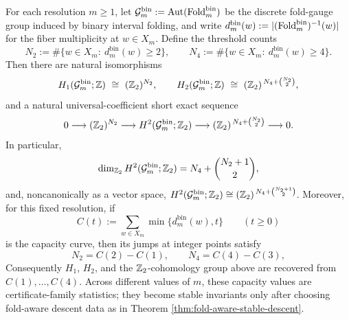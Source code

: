 \begin{theorem}\label{thm:window6-foldbin-gauge-low-degree-homology}
For each resolution \(m\ge 1\), let
\(
\mathcal{G}^{\mathrm{bin}}_m:=\operatorname{Aut}(\operatorname{Fold}^{\mathrm{bin}}_m)
\)
be the discrete fold-gauge group induced by binary interval folding, and write
\(
d^{\mathrm{bin}}_m(w):=\lvert (\operatorname{Fold}^{\mathrm{bin}}_m)^{-1}(w)\rvert
\)
for the fiber multiplicity at \(w\in X_m\).
Define the threshold counts
\[
N_2:=\#\{w\in X_m:\ d^{\mathrm{bin}}_m(w)\ge 2\},
\qquad
N_4:=\#\{w\in X_m:\ d^{\mathrm{bin}}_m(w)\ge 4\}.
\]
Then there are natural isomorphisms
\[
H_1(\mathcal{G}^{\mathrm{bin}}_m;\ZZ)\ \cong\ (\ZZ_2)^{N_2},
\qquad
H_2(\mathcal{G}^{\mathrm{bin}}_m;\ZZ)\ \cong\ (\ZZ_2)^{\,N_4+\binom{N_2}{2}},
\]
and a natural universal-coefficient short exact sequence
\[
0\longrightarrow (\mathbb{Z}_2)^{N_2}
\longrightarrow H^2(\mathcal{G}^{\mathrm{bin}}_m;\mathbb{Z}_2)
\longrightarrow (\mathbb{Z}_2)^{\,N_4+\binom{N_2}{2}}
\longrightarrow 0.
\]
In particular,
\[
\dim_{\mathbb{Z}_2}H^2(\mathcal{G}^{\mathrm{bin}}_m;\mathbb{Z}_2)
=N_4+\binom{N_2+1}{2},
\]
and, noncanonically as a vector space, \(H^2(\mathcal{G}^{\mathrm{bin}}_m;\mathbb{Z}_2)\cong(\mathbb{Z}_2)^{\,N_4+\binom{N_2+1}{2}}\).
Moreover, for this fixed resolution, if
\[
C(t):=\sum_{w\in X_m}\min\{d^{\mathrm{bin}}_m(w),t\}\qquad(t\ge 0)
\]
is the capacity curve, then its jumps at integer points satisfy
\[
N_2=C(2)-C(1),
\qquad
N_4=C(4)-C(3),
\]
Consequently \(H_1\), \(H_2\), and the \(\mathbb{Z}_2\)-cohomology group above are recovered from \(C(1),\dots,C(4)\).  Across different values of \(m\), these capacity values are certificate-family statistics; they become stable invariants only after choosing fold-aware descent data as in Theorem \ref{thm:fold-aware-stable-descent}.
\end{theorem}
